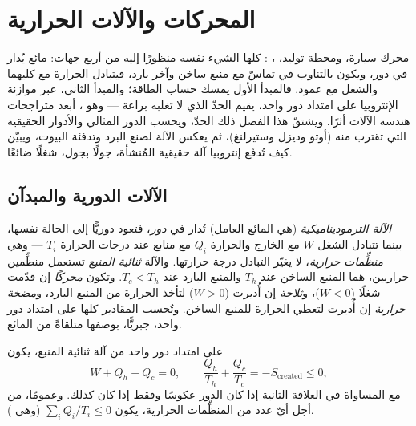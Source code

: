 \chapter{المحركات والآلات الحرارية}\label{ch:b1:heat-engines}

محرك سيارة، ومحطة توليد، ، : كلها الشيء
نفسه منظورًا إليه من أربع جهات: مائع يُدار في دور، ويكون
بالتناوب في تماسّ مع منبع ساخن وآخر بارد، فيتبادل الحرارة مع
كليهما والشغل مع عمود. فالمبدأ الأول يمسك حساب الطاقة؛ والمبدأ
الثاني، عبر موازنة الإنتروبيا على امتداد دور واحد، يقيم الحدّ
الذي لا تغلبه براعة --- وهو ، أبعد متراجحات هندسة الآلات
أثرًا. ويشتقّ هذا الفصل ذلك الحدّ، ويحسب الدور المثالي والأدوار
الحقيقية التي تقترب منه (أوتو وديزل وستيرلنغ)، ثم يعكس الآلة
لصنع البرد وتدفئة البيوت، ويبيّن كيف تُدفَع إنتروبيا آلة حقيقية
المُنشأة، جولًا بجول، شغلًا ضائعًا.

\section{الآلات الدورية والمبدآن}

\begin{definition}\label{def:b1:heat-engines:machine}
\emph{الآلة الترموديناميكية}  (هي المائع العامل)
تُدار في \emph{دور}، فتعود دوريًّا إلى الحالة نفسها،
بينما تتبادل الشغل $W$ مع الخارج والحرارة $Q_i$ مع
منابع عند درجات الحرارة $T_i$ --- وهي \emph{منظِّمات حرارية}، لا يغيّر
التبادل درجة حرارتها. والآلة \emph{ثنائية المنبع} تستعمل
منظِّمين حراريين، هما المنبع الساخن عند $T_h$ والمنبع البارد عند $T_c < T_h$.
وتكون \emph{محركًا} إن قدّمت شغلًا ($W < 0$)، و\emph{ثلاجة}
إن أُديرت ($W > 0$) لتأخذ الحرارة من المنبع
البارد، و\emph{مضخة حرارية} إن أُديرت لتعطي الحرارة للمنبع الساخن.
وتُحسب المقادير كلها على امتداد دور واحد، جبريًّا، بوصفها متلقاةً
من المائع.
\end{definition}

\begin{theorem}\label{thm:b1:heat-engines:clausius}
على امتداد دور واحد من آلة ثنائية المنبع، يكون
\[
W + Q_h + Q_c = 0 , \qquad
\frac{Q_h}{T_h} + \frac{Q_c}{T_c} = -S_{\mathrm{created}} \leq 0 ,
\]
مع المساواة في العلاقة الثانية إذا كان الدور عكوسًا وفقط إذا كان
كذلك. وعمومًا، من أجل أيّ عدد من المنظِّمات الحرارية، يكون
$\sum_i Q_i/T_i \leq 0$ (وهي \emph{}).
\end{theorem}

